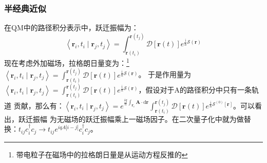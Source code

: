 \documentclass[10pt,openany]{book}
\theoremstyle{thmstyle} %
\theoremstyle{defstyle} %
\theoremstyle{prostyle} %
\begin{document}
\subsubsection{半经典近似}
在QM中的路径积分表示中，跃迁振幅为：
\begin{equation}
	\left\langle\mathbf{r}_i, t_i \mid \mathbf{r}_j, t_j\right\rangle=\int_{\mathbf{r}\left(t_i\right)}^{\mathbf{r}\left(t_j\right)} \mathcal{D}[\mathbf{r}(t)] e^{\frac{\mathrm{i}}{\hbar} \mathcal{S}(\mathbf{r})}
\end{equation}
现在考虑外加磁场，拉格朗日量变为：\footnote{带电粒子在磁场中的拉格朗日量是从运动方程反推的}$ \left\langle\mathbf{r}_i, t_i \mid \mathbf{r}_j, t_j\right\rangle=\int_{\mathbf{r}\left(t_i\right)}^{\mathbf{r}\left(t_j\right)} \mathcal{D}[\mathbf{r}(t)] e^{\frac{\mathrm{i}}{\hbar} \mathcal{S}(\mathbf{r})} $。
于是作用量为$ \left\langle\mathbf{r}_i, t_i \mid \mathbf{r}_j, t_j\right\rangle=\int_{\mathbf{r}\left(t_i\right)}^{\mathbf{r}\left(t_j\right)} \mathcal{D}[\mathbf{r}(t)] e^{\frac{\mathrm{i}}{\hbar} \mathcal{S}(\mathbf{r})} $，假设对于A的路径积分中只有一条轨道
贡献，那么有：$ \left\langle\mathbf{r}_i, t_i \mid \mathbf{r}_j, t_j\right\rangle=e^{\frac{i q}{\hbar} \int_{\mathbf{r}_c} \mathbf{A} \cdot \mathrm{d} \mathbf{r}} \int_{\mathbf{r}\left(t_i\right)}^{\mathbf{r}\left(t_j\right)} \mathcal{D}[\mathbf{r}(t)] e^{\frac{\mathrm{i}}{\hbar} \mathcal{S}^{(0)}[\mathbf{r}]} $。可以看出，跃迁振幅
为无磁场的跃迁振幅乘上一磁场因子。在二次量子化中就为做替换：$ t_{i j} c_i^{\dagger} c_j \rightarrow t_{i j} e^{i q A|i-j|} c_i^{\dagger} c_j $。 
\end{document}
